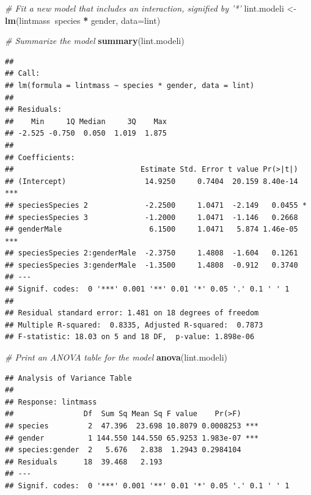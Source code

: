\documentclass[
]{book}
\newenvironment{Shaded}{\begin{snugshade}}{\end{snugshade}}
\newcommand{\CommentTok}[1]{\textcolor[rgb]{0.56,0.35,0.01}{\textit{#1}}}
\newcommand{\DataTypeTok}[1]{\textcolor[rgb]{0.13,0.29,0.53}{#1}}
\newcommand{\KeywordTok}[1]{\textcolor[rgb]{0.13,0.29,0.53}{\textbf{#1}}}
\newcommand{\NormalTok}[1]{#1}
\newcommand{\OperatorTok}[1]{\textcolor[rgb]{0.81,0.36,0.00}{\textbf{#1}}}
\newcommand{\StringTok}[1]{\textcolor[rgb]{0.31,0.60,0.02}{#1}}
\begin{document}
\begin{Shaded}
\begin{Highlighting}[]
\CommentTok{# Fit a new model that includes an interaction, signified by '*'}
\NormalTok{lint.modeli <-}\StringTok{ }\KeywordTok{lm}\NormalTok{(lintmass}\OperatorTok{~}\NormalTok{species }\OperatorTok{*}\StringTok{ }\NormalTok{gender, }\DataTypeTok{data=}\NormalTok{lint)}

\CommentTok{# Summarize the model}
\KeywordTok{summary}\NormalTok{(lint.modeli)}
\end{Highlighting}
\end{Shaded}

\begin{verbatim}
## 
## Call:
## lm(formula = lintmass ~ species * gender, data = lint)
## 
## Residuals:
##    Min     1Q Median     3Q    Max 
## -2.525 -0.750  0.050  1.019  1.875 
## 
## Coefficients:
##                             Estimate Std. Error t value Pr(>|t|)    
## (Intercept)                  14.9250     0.7404  20.159 8.40e-14 ***
## speciesSpecies 2             -2.2500     1.0471  -2.149   0.0455 *  
## speciesSpecies 3             -1.2000     1.0471  -1.146   0.2668    
## genderMale                    6.1500     1.0471   5.874 1.46e-05 ***
## speciesSpecies 2:genderMale  -2.3750     1.4808  -1.604   0.1261    
## speciesSpecies 3:genderMale  -1.3500     1.4808  -0.912   0.3740    
## ---
## Signif. codes:  0 '***' 0.001 '**' 0.01 '*' 0.05 '.' 0.1 ' ' 1
## 
## Residual standard error: 1.481 on 18 degrees of freedom
## Multiple R-squared:  0.8335,	Adjusted R-squared:  0.7873 
## F-statistic: 18.03 on 5 and 18 DF,  p-value: 1.898e-06
\end{verbatim}

\begin{Shaded}
\begin{Highlighting}[]
\CommentTok{# Print an ANOVA table for the model}
\KeywordTok{anova}\NormalTok{(lint.modeli)}
\end{Highlighting}
\end{Shaded}

\begin{verbatim}
## Analysis of Variance Table
## 
## Response: lintmass
##                Df  Sum Sq Mean Sq F value    Pr(>F)    
## species         2  47.396  23.698 10.8079 0.0008253 ***
## gender          1 144.550 144.550 65.9253 1.983e-07 ***
## species:gender  2   5.676   2.838  1.2943 0.2984104    
## Residuals      18  39.468   2.193                      
## ---
## Signif. codes:  0 '***' 0.001 '**' 0.01 '*' 0.05 '.' 0.1 ' ' 1
\end{verbatim}
\end{document}
